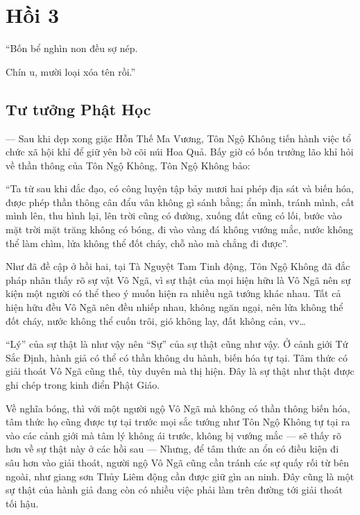 \chapter{Hồi 3} %
\label{cha:hoi_3}

\begin{itshape}
``Bốn bể nghìn non đều sợ nép.

Chín u, mười loại xóa tên rồi.''
\end{itshape}

\section{Tư tưởng Phật Học} %
\label{sec:3_phat_hoc}

— Sau khi dẹp xong giặc Hỗn Thế Ma Vương, Tôn Ngộ Không tiến hành việc tổ chức xã hội khỉ để giữ yên bờ cõi núi Hoa Quả. Bấy giờ có bốn trưởng lão khỉ hỏi về thần thông của Tôn Ngộ Không, Tôn Ngộ Không bảo:

\begin{itshape}
``Ta từ sau khi đắc đạo, có công luyện tập bảy mươi hai phép địa sát và biến hóa, được phép thần thông cân đẩu vân không gì sánh bằng; ẩn mình, tránh mình, cất mình lên, thu hình lại, lên trời cũng có đường, xuống đất cũng có lối, bước vào mặt trời mặt trăng không có bóng, đi vào vàng đá không vướng mắc, nước không thể làm chìm, lửa không thể đốt cháy, chỗ nào mà chẳng đi được''.
\end{itshape}

Như đã đề cập ở hồi hai, tại Tà Nguyệt Tam Tinh động, Tôn Ngộ Không đã đắc pháp nhãn thấy rõ sự vật Vô Ngã, vì sự thật của mọi hiện hữu là Vô Ngã nên sự kiện một người có thể theo ý muốn hiện ra nhiều ngã tướng khác nhau. Tất cả hiện hữu đều Vô Ngã nên đều nhiếp nhau, không ngăn ngại, nên lửa không thể đốt cháy, nước không thể cuốn trôi, gió không lay, đất không cản, vv\ldots

``Lý'' của sự thật là như vậy nên ``Sự'' của sự thật cũng như vậy. Ở cảnh giới Tứ Sắc Định, hành giả có thể có thần không du hành, biến hóa tự tại. Tâm thức có giải thoát Vô Ngã cũng thế, tùy duyên mà thị hiện. Đây là sự thật như thật được ghi chép trong kinh điển Phật Giáo.

Về nghĩa bóng, thì với một người ngộ Vô Ngã mà không có thần thông biến hóa, tâm thức họ cũng được tự tại trước mọi sắc tướng như Tôn Ngộ Không tự tại ra vào các cảnh giới mà tâm lý không ái trước, không bị vướng mắc — sẽ thấy rõ hơn về sự thật này ở các hồi sau — Nhưng, để tâm thức an ổn có điều kiện đi sâu hơn vào giải thoát, người ngộ Vô Ngã cũng cần tránh các sự quấy rối từ bên ngoài, như giang sơn Thủy Liêm động cần được giữ gìn an ninh. Đây cũng là một sự thật của hành giả đang còn có nhiều việc phải làm trên đường tới giải thoát tối hậu.


